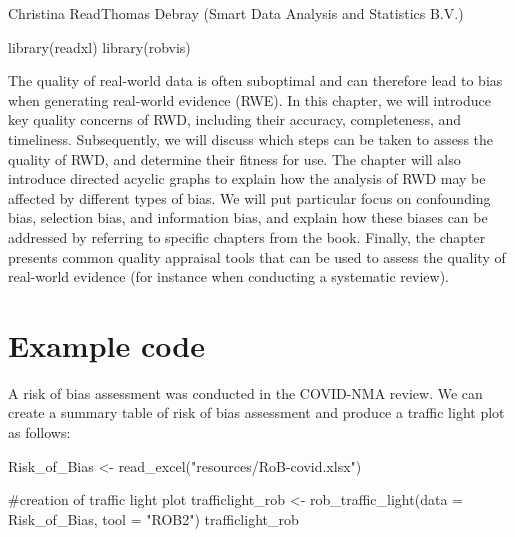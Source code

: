 \documentclass[
  letterpaper,
  DIV=11,
  numbers=noendperiod]{scrreprt}
\newenvironment{Shaded}{\begin{snugshade}}{\end{snugshade}}
\newcommand{\AttributeTok}[1]{\textcolor[rgb]{0.40,0.45,0.13}{#1}}
\newcommand{\CommentTok}[1]{\textcolor[rgb]{0.37,0.37,0.37}{#1}}
\newcommand{\FunctionTok}[1]{\textcolor[rgb]{0.28,0.35,0.67}{#1}}
\newcommand{\NormalTok}[1]{\textcolor[rgb]{0.00,0.23,0.31}{#1}}
\newcommand{\OtherTok}[1]{\textcolor[rgb]{0.00,0.23,0.31}{#1}}
\newcommand{\StringTok}[1]{\textcolor[rgb]{0.13,0.47,0.30}{#1}}
\begin{document}
Christina ReadThomas Debray (Smart Data Analysis and Statistics B.V.)

\hfill\break

\begin{Shaded}
\begin{Highlighting}[]
\FunctionTok{library}\NormalTok{(readxl)}
\FunctionTok{library}\NormalTok{(robvis)}
\end{Highlighting}
\end{Shaded}

The quality of real-world data is often suboptimal and can therefore
lead to bias when generating real-world evidence (RWE). In this chapter,
we will introduce key quality concerns of RWD, including their accuracy,
completeness, and timeliness. Subsequently, we will discuss which steps
can be taken to assess the quality of RWD, and determine their fitness
for use. The chapter will also introduce directed acyclic graphs to
explain how the analysis of RWD may be affected by different types of
bias. We will put particular focus on confounding bias, selection bias,
and information bias, and explain how these biases can be addressed by
referring to specific chapters from the book. Finally, the chapter
presents common quality appraisal tools that can be used to assess the
quality of real-world evidence (for instance when conducting a
systematic review).

\hypertarget{example-code}{%
\section{Example code}\label{example-code}}

A risk of bias assessment was conducted in the COVID-NMA review. We can
create a summary table of risk of bias assessment and produce a traffic
light plot as follows:

\begin{Shaded}
\begin{Highlighting}[]
\NormalTok{Risk\_of\_Bias }\OtherTok{\textless{}{-}} \FunctionTok{read\_excel}\NormalTok{(}\StringTok{"resources/RoB{-}covid.xlsx"}\NormalTok{)}

\CommentTok{\#creation of traffic light plot}
\NormalTok{trafficlight\_rob }\OtherTok{\textless{}{-}} \FunctionTok{rob\_traffic\_light}\NormalTok{(}\AttributeTok{data =}\NormalTok{ Risk\_of\_Bias, }\AttributeTok{tool =} \StringTok{"ROB2"}\NormalTok{)}
\NormalTok{trafficlight\_rob}
\end{Highlighting}
\end{Shaded}
\end{document}
